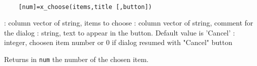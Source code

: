 
\begin{mandesc}
  \\ %
\end{mandesc}
\begin{calling_sequence}
  \begin{verbatim}
    [num]=x_choose(items,title [,button])   
  \end{verbatim}
\end{calling_sequence}
\begin{parameters}
  \begin{varlist}
     : column vector of string,  items to choose
     : column vector of string, comment for the dialog
     :  string, text to appear in the button. Default value is 'Cancel'
     : integer, choosen item number or 0 if dialog resumed with "Cancel" button
  \end{varlist}
\end{parameters}
\begin{mandescription}
  Returns in \verb!num! the number of the chosen item.
\end{mandescription}

\begin{examples}
  \begin{program}
  \end{program}
\end{examples}
\begin{manseealso}
\end{manseealso}

